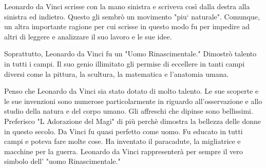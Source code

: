 \documentclass[12pt, a4]{article}
\begin{document}
    Leonardo da Vinci scrisse con la mano sinistra e scriveva così dalla destra alla sinistra ed indietro. Questo gli sembrò un movimento "piu` naturale". Comunque, un altra importante ragione per cui scrisse in questo modo fu per impedire ad altri di leggere e analizzare il suo lavoro e le sue idee.

    Soprattutto, Leonardo da Vinci fu un "Uomo Rinascimentale." Dimostrò talento in tutti i campi. Il suo genio illimitato gli permise di eccellere in tanti campi diversi come la pittura, la scultura, la matematica e l'anatomia umana.

    Penso che Leonardo da Vinci sia stato dotato di molto talento. Le sue scoperte e le sue invenzioni sono numerose particolarmente in riguardo all'osservazione e allo studio della natura e del corpo umano. Gli affreschi che dipinse sono bellissimi. Preferisco "L Adorazione del Magi" di più perchè dimostra la bellezza delle donne in questo secolo. Da Vinci fu quasi perfetto come uomo. Fu educato in tutti campi e poteva fare molte cose. Ha inventato il paracadute, la migliatrice e macchine per la guerra. Leonardo da Vinci rappresenterà per sempre il vero simbolo dell' "uomo Rinascimentale." 
\end{document}
